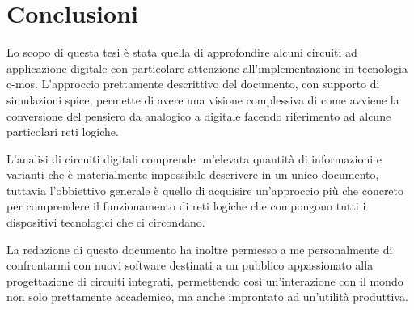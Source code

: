 \chapter{Conclusioni}
	
	Lo scopo di questa tesi è stata quella di approfondire alcuni circuiti ad applicazione digitale con particolare attenzione all'implementazione in tecnologia c-mos. L'approccio prettamente descrittivo del documento, con supporto di simulazioni spice, permette di avere una visione complessiva di come avviene la conversione del pensiero da analogico a digitale facendo riferimento ad alcune particolari reti logiche.
	
	L'analisi di circuiti digitali comprende un'elevata quantità di informazioni e varianti che è materialmente impossibile descrivere in un unico documento, tuttavia l'obbiettivo generale è quello di acquisire un'approccio più che concreto per comprendere il funzionamento di reti logiche che compongono tutti i dispositivi tecnologici che ci circondano.
	
	La redazione di questo documento ha inoltre permesso a me personalmente di confrontarmi con nuovi software destinati a un pubblico appassionato alla progettazione di circuiti integrati, permettendo così un'interazione con il mondo non solo prettamente accademico, ma anche improntato ad un'utilità produttiva.